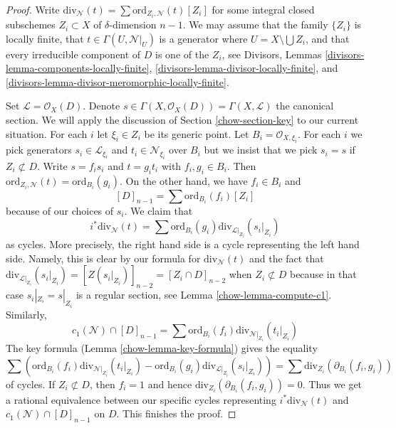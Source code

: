 \begin{proof}

Write $\text{div}_\mathcal{N}(t) = \sum \text{ord}_{Z_i, \mathcal{N}}(t)[Z_i]$
for some integral closed subschemes $Z_i \subset X$ of $\delta$-dimension
$n - 1$. We may assume that the family $\{Z_i\}$ is locally
finite, that $t \in \Gamma(U, \mathcal{N}|_U)$ is a generator
where $U = X \setminus \bigcup Z_i$, and that every irreducible component
of $D$ is one of the $Z_i$, see
Divisors, Lemmas \ref{divisors-lemma-components-locally-finite},
\ref{divisors-lemma-divisor-locally-finite}, and
\ref{divisors-lemma-divisor-meromorphic-locally-finite}.

\medskip\noindent
Set $\mathcal{L} = \mathcal{O}_X(D)$. Denote
$s \in \Gamma(X, \mathcal{O}_X(D)) = \Gamma(X, \mathcal{L})$
the canonical section. We will apply the discussion of
Section \ref{chow-section-key} to our current situation.
For each $i$ let $\xi_i \in Z_i$ be its generic point. Let
$B_i = \mathcal{O}_{X, \xi_i}$. For each $i$ we pick generators
$s_i \in \mathcal{L}_{\xi_i}$ and $t_i \in \mathcal{N}_{\xi_i}$
over $B_i$ but we insist that we pick $s_i = s$ if $Z_i \not \subset D$.
Write $s = f_i s_i$ and $t = g_i t_i$ with $f_i, g_i \in B_i$.
Then $\text{ord}_{Z_i, \mathcal{N}}(t) = \text{ord}_{B_i}(g_i)$.
On the other hand, we have $f_i \in B_i$ and
$$
[D]_{n - 1} = \sum \text{ord}_{B_i}(f_i)[Z_i]
$$
because of our choices of $s_i$. We claim that
$$
i^*\text{div}_\mathcal{N}(t) =
\sum \text{ord}_{B_i}(g_i) \text{div}_{\mathcal{L}|_{Z_i}}(s_i|_{Z_i})
$$
as cycles. More precisely, the right hand side is a cycle
representing the left hand side. Namely, this is clear by our
formula for $\text{div}_\mathcal{N}(t)$ and the fact that
$\text{div}_{\mathcal{L}|_{Z_i}}(s_i|_{Z_i}) = [Z(s_i|_{Z_i})]_{n - 2} =
[Z_i \cap D]_{n - 2}$ when $Z_i \not \subset D$ because in
that case $s_i|_{Z_i} = s|_{Z_i}$ is a regular section, see
Lemma \ref{chow-lemma-compute-c1}. Similarly,
$$
c_1(\mathcal{N}) \cap [D]_{n - 1} =
\sum \text{ord}_{B_i}(f_i) \text{div}_{\mathcal{N}|_{Z_i}}(t_i|_{Z_i})
$$
The key formula (Lemma \ref{chow-lemma-key-formula}) gives the equality
$$
\sum \left(
\text{ord}_{B_i}(f_i) \text{div}_{\mathcal{N}|_{Z_i}}(t_i|_{Z_i}) -
\text{ord}_{B_i}(g_i) \text{div}_{\mathcal{L}|_{Z_i}}(s_i|_{Z_i}) \right) =
\sum \text{div}_{Z_i}(\partial_{B_i}(f_i, g_i))
$$
of cycles. If $Z_i \not \subset D$, then $f_i = 1$ and hence
$\text{div}_{Z_i}(\partial_{B_i}(f_i, g_i)) = 0$. Thus we get a rational
equivalence between our specific cycles representing
$i^*\text{div}_\mathcal{N}(t)$ and $c_1(\mathcal{N}) \cap [D]_{n - 1}$
on $D$. This finishes the proof.
\end{proof}

